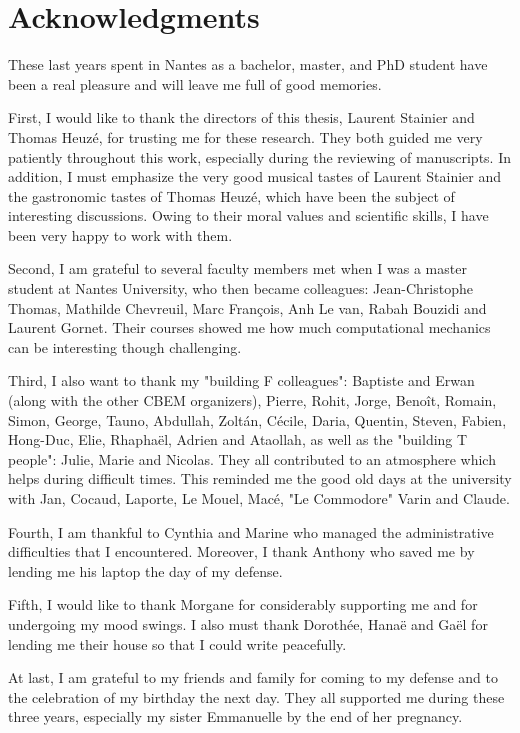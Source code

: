 \documentclass[10pt,a4paper,twoside]{report}
\begin{document}
\newpage

\section*{Acknowledgments}
These last years spent in Nantes as a bachelor, master, and PhD student have been a real pleasure and will leave me full of good memories.

First, I would like to thank the directors of this thesis, Laurent Stainier and Thomas Heuz{\'e}, for trusting me for these research.
They both guided me very patiently throughout this work, especially during the reviewing of manuscripts.
In addition, I must emphasize the very good musical tastes of Laurent Stainier and the gastronomic tastes of Thomas Heuz{\'e}, which have been the subject of interesting discussions.
Owing to their moral values and scientific skills, I have been very happy to work with them.

Second, I am grateful to several faculty members met when I was a master student at Nantes University, who then became colleagues: Jean-Christophe Thomas, Mathilde Chevreuil, Marc Fran{\c c}ois, Anh Le van, Rabah Bouzidi and Laurent Gornet. 
Their courses showed me how much computational mechanics can be interesting though challenging.

Third, I also want to thank my "building F colleagues": Baptiste and Erwan (along with the other CBEM organizers), Pierre, Rohit, Jorge, Beno{\^i}t, Romain, Simon, George, Tauno, Abdullah, Zolt{\'a}n, C{\'e}cile, Daria, Quentin, Steven, Fabien, Hong-Duc, Elie, Rhapha{\"e}l, Adrien and Ataollah, as well as the "building T people": Julie, Marie and Nicolas.
They all contributed to an atmosphere which helps during difficult times. 
This reminded me the good old days at the university with Jan, Cocaud, Laporte, Le Mouel, Mac{\'e}, "Le Commodore" Varin and Claude.

Fourth, I am thankful to Cynthia and Marine who managed the administrative difficulties that I encountered.
Moreover, I thank Anthony who saved me by lending me his laptop the day of my defense.

Fifth, I would like to thank Morgane for considerably supporting me and for undergoing my mood swings.
I also must thank Doroth{\'e}e, Hana{\"e} and Ga{\"e}l for lending me their house so that I could write peacefully.


At last, I am grateful to my friends and family for coming to my defense and to the celebration of my birthday the next day. 
They all supported me during these three years, especially my sister Emmanuelle by the end of her pregnancy.
\end{document}
